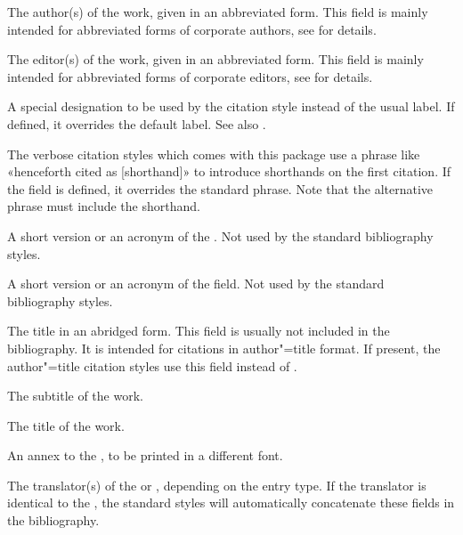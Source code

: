 \documentclass{ltxdockit}[2011/03/25]
\begin{document}
\begin{fieldlist}
The author(s) of the work, given in an abbreviated form. This field is mainly intended for abbreviated forms of corporate authors, see  for details.


The editor(s) of the work, given in an abbreviated form. This field is mainly intended for abbreviated forms of corporate editors, see  for details.


A special designation to be used by the citation style instead of the usual label. If defined, it overrides the default label. See also .


The verbose citation styles which comes with this package use a phrase like «henceforth cited as [shorthand]» to introduce shorthands on the first citation. If the  field is defined, it overrides the standard phrase. Note that the alternative phrase must include the shorthand.


A short version or an acronym of the . Not used by the standard bibliography styles.


A short version or an acronym of the  field. Not used by the standard bibliography styles.


The title in an abridged form. This field is usually not included in the bibliography. It is intended for citations in author"=title format. If present, the author"=title citation styles use this field instead of .


The subtitle of the work.


The title of the work.


An annex to the , to be printed in a different font.


The translator(s) of the  or , depending on the entry type. If the translator is identical to the , the standard styles will automatically concatenate these fields in the bibliography.


\end{fieldlist}
\end{document}
